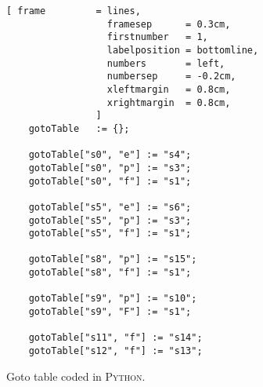 \begin{figure}[!ht]
\centering
\begin{Verbatim}[ frame         = lines, 
                  framesep      = 0.3cm, 
                  firstnumber   = 1,
                  labelposition = bottomline,
                  numbers       = left,
                  numbersep     = -0.2cm,
                  xleftmargin   = 0.8cm,
                  xrightmargin  = 0.8cm,
                ]
    gotoTable   := {};

    gotoTable["s0", "e"] := "s4";
    gotoTable["s0", "p"] := "s3";
    gotoTable["s0", "f"] := "s1";
    
    gotoTable["s5", "e"] := "s6";
    gotoTable["s5", "p"] := "s3";
    gotoTable["s5", "f"] := "s1";
    
    gotoTable["s8", "p"] := "s15";
    gotoTable["s8", "f"] := "s1";
    
    gotoTable["s9", "p"] := "s10";
    gotoTable["s9", "F"] := "s1";
    
    gotoTable["s11", "f"] := "s14";
    gotoTable["s12", "f"] := "s13";
\end{Verbatim}
\vspace*{-0.3cm}
\caption{Goto table coded in \textsc{Python}.}
\label{fig:parse-table.stlx:goto}
\end{figure}


